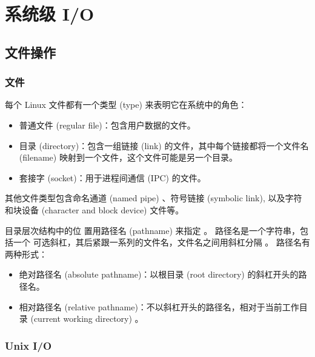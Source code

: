 \section{系统级 I/O}

\subsection{文件操作}

\subsubsection{文件}

每个 Linux 文件都有一个类型 (type) 来表明它在系统中的角色：
\begin{itemize}
    \item 普通文件 (regular file)：包含用户数据的文件。
    \item 目录 (directory)：包含一组链接 (link) 的文件，其中每个链接都将一个文件名 (filename) 映射到一个文件，这个文件可能是另一个目录。
    \item 套接字 (socket)：用于进程间通信 (IPC) 的文件。
\end{itemize}

其他文件类型包含命名通道 (named pipe) 、符号链接 (symbolic link), 以及字符和块设备 (character and block device) 文件等。

目录层次结构中的位 置用路径名 (pathname) 来指定 。 路径名是一个字符串，包括一个
可选斜杠，其后紧跟一系列的文件名，文件名之间用斜杠分隔 。 路径名有两种形式：
\begin{itemize}
    \item 绝对路径名 (absolute pathname)：以根目录 (root directory) 的斜杠开头的路径名。
    \item 相对路径名 (relative pathname)：不以斜杠开头的路径名，相对于当前工作目录 (current working directory) 。
\end{itemize}

\subsubsection{Unix I/O}

